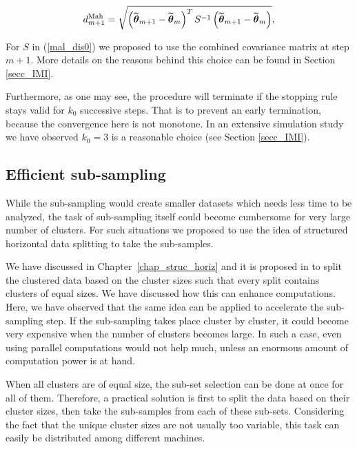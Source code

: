 \documentclass[11pt,a5paper,twoside]{book}
\newcommand{\bftheta}{\mbox{\boldmath $\theta$}}
\begin{document}
\begin{equation}
\label{mal_dis0}
d_{m+1}^{\mathrm{Mah}} = \sqrt{\left(\widetilde{\bftheta}_{m+1}- \widetilde{\bftheta}_{m}\right)^T S^{-1} \left(\widetilde{\bftheta}_{m+1}- \widetilde{\bftheta}_{m}\right)},
\end{equation}

For $S$ in (\ref{mal_dis0}) we proposed to use the combined covariance matrix at step $m+1$. More details on the reasons behind this choice can be found in Section \ref{secc_IMI}.

Furthermore, as one may see, the procedure will terminate if the stopping rule stays valid for $k_0$ successive steps. That is to prevent an early termination, because the convergence here is not monotone. In an extensive simulation study we have observed $k_0=3$ is a reasonable choice (see Section \ref{secc_IMI}).



\subsection{Efficient sub-sampling}

While the sub-sampling would create smaller datasets which needs less time to be analyzed, the task of sub-sampling itself could become cumbersome for very large number of clusters. For such situations we proposed to use the idea of structured horizontal data splitting to take the sub-samples. 

We have discussed in Chapter~\ref{chap_struc_horiz} and it is proposed in \cite{hermans2017_cs,hermans2017_ar1} to split the clustered data based on the cluster sizes such that every split contains clusters of equal sizes. We have discussed how this can enhance computations. Here, we have observed that the same idea can be applied to accelerate the sub-sampling step. If the sub-sampling takes place cluster by cluster, it could become very expensive when the number of clusters becomes large. In such a case, even using parallel computations would not help much, unless an enormous amount of computation power is at hand. 

When all clusters are of equal size, the sub-set selection can be done at once for all of them. Therefore, a practical solution is first to split the data based on their cluster sizes, then take the sub-samples from each of these sub-sets. Considering the fact that the unique cluster sizes are not usually too variable, this task can easily be distributed among different machines. 
\end{document}
